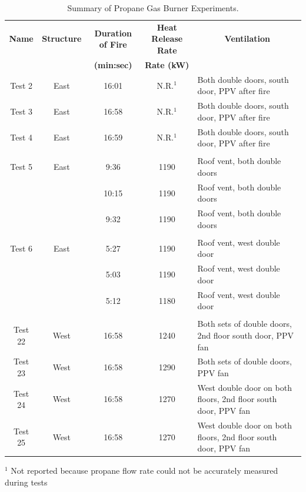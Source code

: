 \renewcommand{\baselinestretch}{1}
\begin{table}
\begin{center}
\caption{Summary of Propane Gas Burner Experiments.}
\begin{tabular}{ccccl}
\toprule
\textbf{Name}  	& 	\textbf{Structure} 	& 	\textbf{Duration of Fire} 	& 	\textbf{Heat Release Rate} 	& 	\multicolumn{1}{c}{\textbf{Ventilation}}	\\ 
				& 						& 		\textbf{(min:sec)} 		& 	\textbf{Rate (kW)}			& 													\\
\midrule
Test 2 			& 	East 				&  		16:01 					& 	N.R.$^1$ 					& 	Both double doors, south door, PPV after fire	\\
Test 3			& 	East 				&  		16:58 					&   N.R.$^1$   					& 	Both double doors, south door, PPV after fire					\\
Test 4			& 	East 				&  		16:59 					&  	N.R.$^1$ 					& 	Both double doors, south door, PPV after fire					\\
\multicolumn{5}{c}{} \\
Test 5 			& 	East 				&  		 9:36 					&  		1190 					& 	Roof vent, both double doors				 					\\
				& 						& 		10:15 					&  		1190 					& 	Roof vent, both double doors				 					\\
				& 						& 		 9:32 					&  		1190 					& 	Roof vent, both double doors				 					\\				
\multicolumn{5}{c}{} \\
Test 6			&	East 				&  		 5:27 					&  		1190 					& 	Roof vent, west double door					 	    			\\
				& 						& 		 5:03 					&  		1190 					& 	Roof vent, west double door					 	    			\\
				& 						& 		 5:12 					&  		1180 					& 	Roof vent, west double door					 	    			\\
\multicolumn{5}{c}{} \\
Test 22			&	West 				&  		16:58 					&  		1240 					& 	Both sets of double doors, 2nd floor south door, PPV fan 		\\
Test 23			&	West 				&  		16:58 					&  		1290 					& 	Both sets of double doors, PPV fan						 		\\
Test 24			&	West 				&  		16:58 					&  		1270 					&   West double door on both floors, 2nd floor south door, PPV fan 	\\
Test 25			&	West 				&  		16:58 					&  		1270 					& 	West double door on both floors, 2nd floor south door, PPV fan 	\\
\bottomrule
\end{tabular}
\end{center}
$^1$ \footnotesize Not reported because propane flow rate could not be accurately measured during tests
\label{table:exp_summary}
\end{table}
\clearpage


